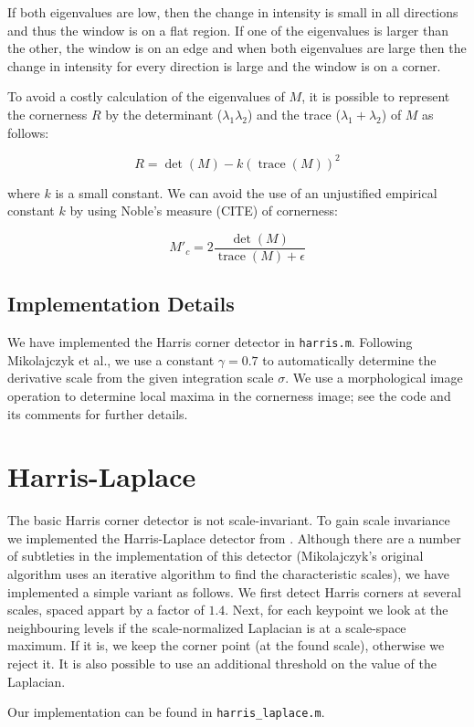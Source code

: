 \documentclass[a4paper,10pt]{article}
\begin{document}
If both eigenvalues are low, then the change in intensity is small in all directions and thus the window is on a flat region. If one of the eigenvalues is larger than the other, the window is on an edge and when both eigenvalues are large then the change in intensity for every direction is large and the window is on a corner.

To avoid a costly calculation of the eigenvalues of $M$, it is possible to represent the cornerness $R$ by the determinant ($\lambda_1 \lambda_2$) and the trace ($\lambda_1 + \lambda_2$) of $M$ as follows:

\[R = \det( M ) - k(\operatorname{trace}( M ))^2\]

where $k$ is a small constant. We can avoid the use of an unjustified empirical constant $k$ by using Noble's measure (CITE) of cornerness:

\[M'_c = 2 \frac{\det( M )}{\operatorname{trace}( M ) + \epsilon}\]

\subsection{Implementation Details}
We have implemented the Harris corner detector in \verb+harris.m+.
Following Mikolajczyk et al.\cite{Mikolajczyk2004}, we use a constant $\gamma = 0.7$ to automatically determine the derivative scale from the given integration scale $\sigma$.
We use a morphological image operation to determine local maxima in the cornerness image; see the code and its comments for further details.

\section{Harris-Laplace}
The basic Harris corner detector is not scale-invariant.
To gain scale invariance we implemented the Harris-Laplace detector from \cite{Mikolajczyk2004}.
Although there are a number of subtleties in the implementation of this detector (Mikolajczyk's original algorithm uses an iterative algorithm to find the characteristic scales), we have implemented a simple variant as follows.
We first detect Harris corners at several scales, spaced appart by a factor of $1.4$.
Next, for each keypoint we look at the neighbouring levels if the scale-normalized Laplacian is at a scale-space maximum.
If it is, we keep the corner point (at the found scale), otherwise we reject it.
It is also possible to use an additional threshold on the value of the Laplacian.

Our implementation can be found in \verb+harris_laplace.m+.
\end{document}
